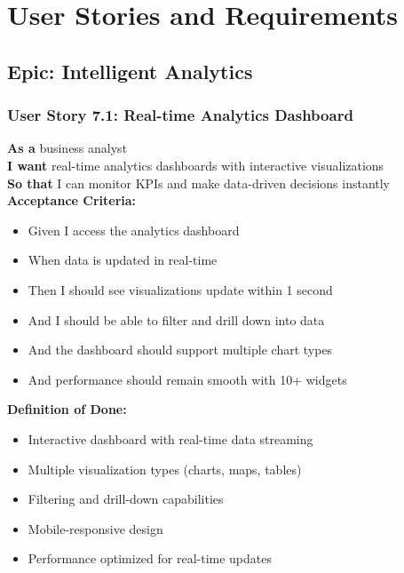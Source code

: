 \section{User Stories and Requirements}

\subsection{Epic: Intelligent Analytics}

\subsubsection{User Story 7.1: Real-time Analytics Dashboard}

\begin{tcolorbox}[colback=lightgray, colframe=primaryblue, title=US-7.1: Real-time Analytics Dashboard]
\textbf{As a} business analyst \\
\textbf{I want} real-time analytics dashboards with interactive visualizations \\
\textbf{So that} I can monitor KPIs and make data-driven decisions instantly \\

\textbf{Acceptance Criteria:}
\begin{itemize}
    \item Given I access the analytics dashboard
    \item When data is updated in real-time
    \item Then I should see visualizations update within 1 second
    \item And I should be able to filter and drill down into data
    \item And the dashboard should support multiple chart types
    \item And performance should remain smooth with 10+ widgets
\end{itemize}

\textbf{Definition of Done:}
\begin{itemize}
    \item Interactive dashboard with real-time data streaming
    \item Multiple visualization types (charts, maps, tables)
    \item Filtering and drill-down capabilities
    \item Mobile-responsive design
    \item Performance optimized for real-time updates
\end{itemize}
\end{tcolorbox}

